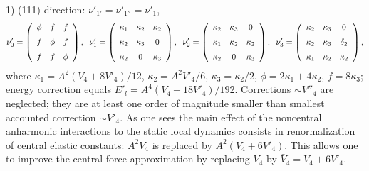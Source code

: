 1) (111)-direction: $\nu'_{1'} = \nu'_{1''} = \nu'_1$, 
\[ \nu'_0 = \left (\begin{array}{ccc}
\phi&f&f\\\noalign{\medskip}f&\phi&f\\\noalign{\medskip}f
&f&\phi\end {array}\right ),\;\;
\nu'_1 = \left (\begin{array}{ccc}
\kappa_1&\kappa_2&\kappa_2\\\noalign{\medskip}\kappa_2&\kappa_3&0\\\noalign
{\medskip}\kappa_2
&0&\kappa_3\end {array}\right ),\;\;
\nu'_2 = \left (\begin{array}{ccc}
\kappa_2&\kappa_3&0\\\noalign{\medskip}\kappa_1&\kappa_2&\kappa_2\\\noalign
{\medskip}\kappa_2
&0&\kappa_3\end{array}\right ) ,\;\;
\nu'_3 = \left (\begin{array}{ccc}
\kappa_2&\kappa_3&0\\\noalign{\medskip}\kappa_2&\kappa_3&\delta_2\\\noalign
{\medskip}\kappa_1
&\kappa_2&\kappa_2\end{array}\right ) ,\]
where $\kappa_1 = A^2(V_4 + 8V'_4)/12$,
$\kappa_2 = A^2V'_4/6$, $\kappa_3 = \kappa_2/2$, $\phi=2\kappa_1 + 4\kappa_2$,
$f = 8\kappa_3$; 
energy correction equals $E'_l = A^4(V_4 + 18V'_4)/192$.
Corrections 
$\sim V''_4$ are neglected; they are at least one order of magnitude smaller
than smallest accounted correction $\sim V'_4$.  
As one sees the main effect of the noncentral anharmonic interactions 
to the static local dynamics consists in renormalization of 
central elastic constants: $A^2V_4$ is 
replaced by $A^2(V_4 + 6V'_4)$. This allows one to improve the central-force 
approximation by replacing $V_4$ by $\bar{V}_4 = V_4 + 6V'_4$.

